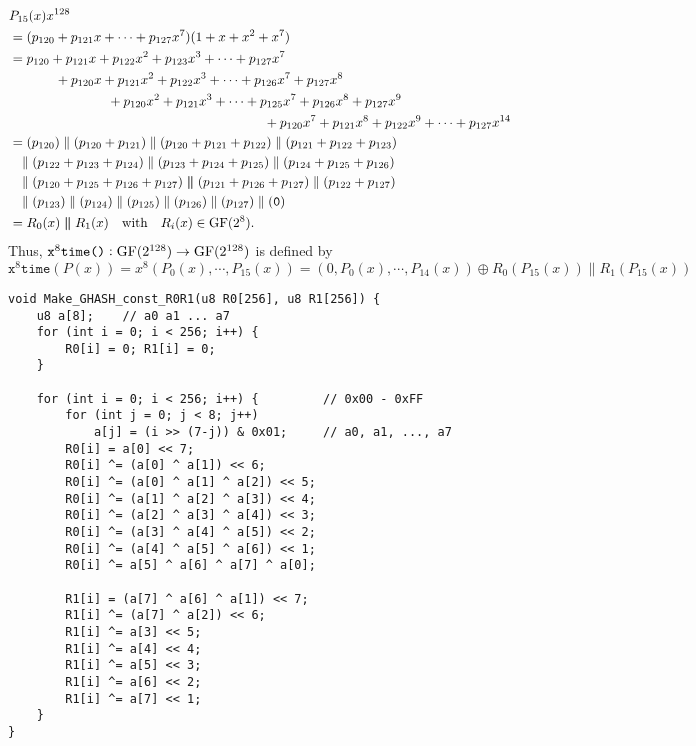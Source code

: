 \newpage
\begin{align*}
	&P_{15}(x)x^{128}\\
	&=(p_{120}+p_{121}x+\cdots+p_{127}x^{7})(1+x+x^2+x^7)\\
	&=p_{120}+p_{121}x+p_{122}x^2+p_{123}x^3+\cdots+p_{127}x^{7}\\
	&\hspace{1.225cm}+p_{120}x+p_{121}x^2+p_{122}x^3+\cdots+p_{126}x^7+p_{127}x^{8}\\
	&\hspace{2.625cm}+p_{120}x^2+p_{121}x^3+\cdots+p_{125}x^7+p_{126}x^8+p_{127}x^{9}\\
	&\hspace{6.8cm}+p_{120}x^7+p_{121}x^8+p_{122}x^{9}+\cdots+p_{127}x^{14} \\
	&=(p_{120})\parallel(p_{120}+p_{121})\parallel(p_{120}+p_{121}+p_{122})\parallel(p_{121}+p_{122}+p_{123})\\
	&\hspace{.25cm}\parallel(p_{122}+p_{123}+p_{124})\parallel(p_{123}+p_{124}+p_{125})\parallel(p_{124}+p_{125}+p_{126})\\
	&\hspace{.25cm}\parallel(p_{120}+p_{125}+p_{126}+p_{127})
	\boldsymbol{\parallel}(p_{121}+p_{126}+p_{127})\parallel(p_{122}+p_{127})\\
	&\hspace{.25cm}\parallel(p_{123})\parallel(p_{124})\parallel(p_{125})\parallel(p_{126})\parallel(p_{127})\parallel(\texttt{0})\\
	&=R_0(x)\boldsymbol{\parallel} R_1(x)\quad\text{with}\quad R_i(x)\in\GF(2^8).
\end{align*}
\vfill
Thus, $\texttt{x$^8$time()}:\normalfont\text{GF}(2^{128})\to \normalfont\text{GF}(2^{128})$ is defined by \[
\texttt{x$^8$time}(P(x))=x^8(P_0(x), \cdots, P_{15}(x))=(0,P_0(x), \cdots, P_{14}(x))\oplus R_0(P_{15}(x))\parallel R_1(P_{15}(x))
\]\vfill
\begin{lstlisting}[style=C]
void Make_GHASH_const_R0R1(u8 R0[256], u8 R1[256]) {
	u8 a[8];    // a0 a1 ... a7
	for (int i = 0; i < 256; i++) {
		R0[i] = 0; R1[i] = 0;
	}
	
	for (int i = 0; i < 256; i++) { 		// 0x00 - 0xFF
		for (int j = 0; j < 8; j++)
			a[j] = (i >> (7-j)) & 0x01; 	// a0, a1, ..., a7
		R0[i] = a[0] << 7;
		R0[i] ^= (a[0] ^ a[1]) << 6;
		R0[i] ^= (a[0] ^ a[1] ^ a[2]) << 5;
		R0[i] ^= (a[1] ^ a[2] ^ a[3]) << 4;
		R0[i] ^= (a[2] ^ a[3] ^ a[4]) << 3;
		R0[i] ^= (a[3] ^ a[4] ^ a[5]) << 2;
		R0[i] ^= (a[4] ^ a[5] ^ a[6]) << 1;
		R0[i] ^= a[5] ^ a[6] ^ a[7] ^ a[0];
		
		R1[i] = (a[7] ^ a[6] ^ a[1]) << 7;
		R1[i] ^= (a[7] ^ a[2]) << 6;
		R1[i] ^= a[3] << 5;
		R1[i] ^= a[4] << 4;
		R1[i] ^= a[5] << 3;
		R1[i] ^= a[6] << 2;
		R1[i] ^= a[7] << 1;
	}
}
\end{lstlisting}






















